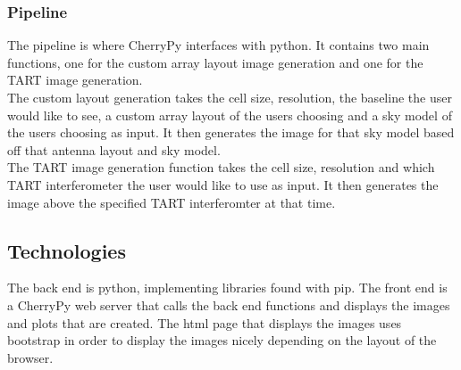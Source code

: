 \subsubsection{Pipeline}
The pipeline is where CherryPy interfaces with python. It contains two main functions, one for the custom array layout image generation and one for the TART image generation. \\The custom layout generation takes the cell size, resolution, the baseline the user would like to see, a custom array layout of the users choosing and a sky model of the users choosing as input. It then generates the image for that sky model based off that antenna layout and sky model.\\
The TART image generation function takes the cell size, resolution and which TART interferometer the user would like to use as input. It then generates the image above the specified TART interferomter at that time.

\subsection{Technologies}
The back end is python, implementing libraries found with pip. The front end is a CherryPy web server\cite{Cherrypy} that calls the back end functions and displays the images and plots that are created. The html page that displays the images uses bootstrap\cite{Bootstrap} in order to display the images nicely depending on the layout of the browser.